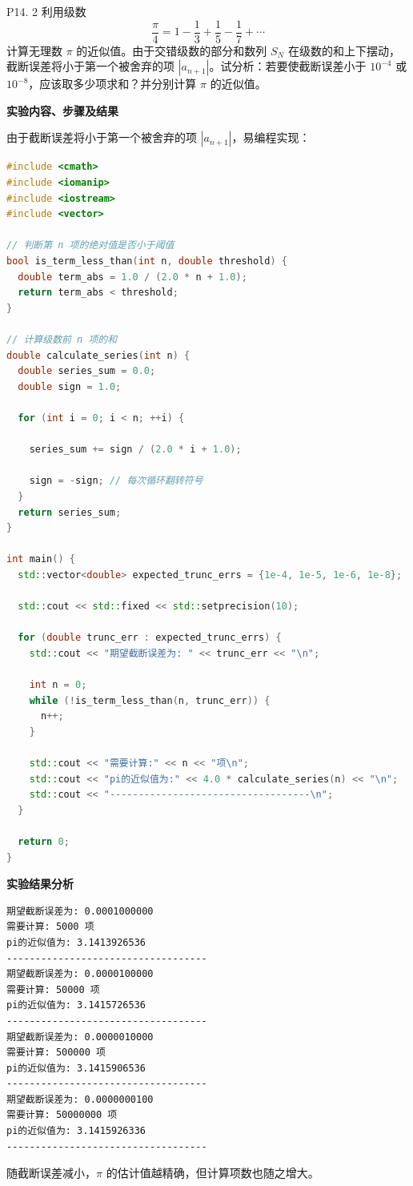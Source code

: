 \documentclass[11pt, a4paper]{ctexart} %
\begin{document}
\begin{problem}{P14. 2}
    利用级数
    \[
        \frac{\pi}{4}=1-\frac{1}{3}+\frac{1}{5}-\frac{1}{7}+\cdots
    \]
    计算无理数 $\pi$ 的近似值。由于交错级数的部分和数列 $S_N$ 在级数的和上下摆动，截断误差将小于第一个被舍弃的项 $\left|a_{n+1}\right|$。试分析：若要使截断误差小于 $10^{-4}$ 或 $10^{-8}$，应该取多少项求和？并分别计算 $\pi$ 的近似值。
\end{problem}

\begin{solution}
    \textbf{实验内容、步骤及结果}

    由于截断误差将小于第一个被舍弃的项 $\left|a_{n+1}\right|$，易编程实现：

\begin{lstlisting}[language=c++]
#include <cmath>
#include <iomanip>
#include <iostream>
#include <vector>

// 判断第 n 项的绝对值是否小于阈值
bool is_term_less_than(int n, double threshold) {
  double term_abs = 1.0 / (2.0 * n + 1.0);
  return term_abs < threshold;
}

// 计算级数前 n 项的和
double calculate_series(int n) {
  double series_sum = 0.0;
  double sign = 1.0;

  for (int i = 0; i < n; ++i) {

    series_sum += sign / (2.0 * i + 1.0);

    sign = -sign; // 每次循环翻转符号
  }
  return series_sum;
}

int main() {
  std::vector<double> expected_trunc_errs = {1e-4, 1e-5, 1e-6, 1e-8};

  std::cout << std::fixed << std::setprecision(10);

  for (double trunc_err : expected_trunc_errs) {
    std::cout << "期望截断误差为: " << trunc_err << "\n";

    int n = 0;
    while (!is_term_less_than(n, trunc_err)) {
      n++;
    }

    std::cout << "需要计算:" << n << "项\n";
    std::cout << "pi的近似值为:" << 4.0 * calculate_series(n) << "\n";
    std::cout << "-----------------------------------\n";
  }

  return 0;
}
\end{lstlisting}

    \textbf{实验结果分析}

\begin{lstlisting}
期望截断误差为: 0.0001000000
需要计算: 5000 项
pi的近似值为: 3.1413926536
-----------------------------------
期望截断误差为: 0.0000100000
需要计算: 50000 项
pi的近似值为: 3.1415726536
-----------------------------------
期望截断误差为: 0.0000010000
需要计算: 500000 项
pi的近似值为: 3.1415906536
-----------------------------------
期望截断误差为: 0.0000000100
需要计算: 50000000 项
pi的近似值为: 3.1415926336
-----------------------------------
\end{lstlisting}

    随截断误差减小，$\pi$ 的估计值越精确，但计算项数也随之增大。
\end{solution}
\end{document}
